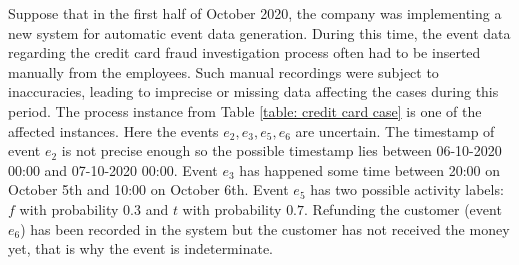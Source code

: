 %
%
%
Suppose that in the first half of October 2020, the company was implementing a new system for automatic event data generation.
During this time, the event data regarding the credit card fraud investigation process often had to be inserted manually from the employees.
Such manual recordings were subject to inaccuracies, leading to imprecise or missing data affecting the cases during this period.
The process instance from Table \ref{table: credit card case} is one of the affected instances.
Here the events $e_2,e_3,e_5,e_6$ are uncertain.
The timestamp of event $e_2$ is not precise enough so the possible timestamp lies between 06-10-2020 00:00 and 07-10-2020 00:00.
Event $e_3$ has happened some time between 20:00 on October 5th and 10:00 on October 6th. 
Event $e_5$ has two possible activity labels: $f$ with probability $0.3$ and $t$ with probability $0.7$.
Refunding the customer (event $e_6$) has been recorded in the system but the customer has not received the money yet, that is why the event is indeterminate.

